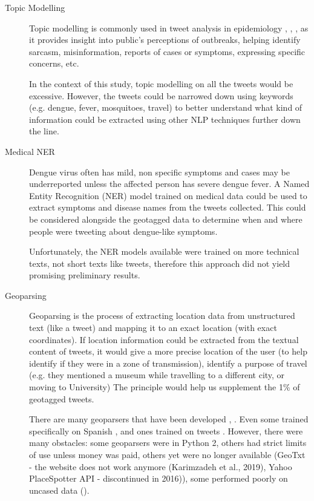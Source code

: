 \begin{description}

    \item[Topic Modelling]
    Topic modelling is commonly used in tweet analysis in epidemiology \cite{missier_tracking_2016}, \cite{chen_syndromic_2015}, \cite{paul_discovering_2014}, \cite{wicke_framing_2020} as it provides insight into public’s perceptions of outbreaks, helping identify sarcasm, misinformation, reports of cases or symptoms, expressing specific concerns, etc. 

    In the context of this study, topic modelling on all the tweets would be excessive. However, the tweets could be narrowed down using keywords (e.g. dengue, fever, mosquitoes, travel) to better understand what kind of information could be extracted using other NLP techniques further down the line.
    
    \item[Medical NER]
    Dengue virus often has mild, non specific symptoms and cases may be underreported unless the affected person has severe dengue fever. A Named Entity Recognition (NER) model trained on medical data could be used to extract symptoms and disease names from the tweets collected. This could be considered alongside the geotagged data to determine when and where people were tweeting about dengue-like symptoms. 

    Unfortunately, the NER models available were trained on more technical texts, not short texts like tweets, therefore this approach did not yield promising preliminary results.

    \item[Geoparsing]
    Geoparsing is the process of extracting location data from unstructured text (like a tweet) and mapping it to an exact location (with exact coordinates). If location information could be extracted from the textual content of tweets, it would give a more precise location of the user (to help identify if they were in a zone of transmission), identify a purpose of travel (e.g. they mentioned a museum while travelling to a different city, or moving to University) The principle would help us supplement the 1\% of geotagged tweets. 
    
    There are many geoparsers that have been developed \cite{de_bruijn_taggs_2017}, \cite{wang_enhancing_2019}. Even some trained specifically on Spanish \cite{gelernter_cross-lingual_2013}, and ones trained on tweets \cite{de_bruijn_taggs_2017}. However, there were many obstacles: some geoparsers were in Python 2, others had strict limits of use unless money was paid, others yet were no longer available (GeoTxt - the website does not work anymore (Karimzadeh et al., 2019), Yahoo PlaceSpotter API - discontinued in 2016)), some performed poorly on uncased data (\cite{noauthor_welcome_nodate}).
    

\end{description}
